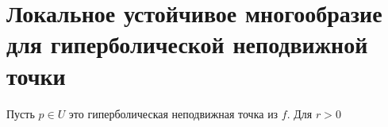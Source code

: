 \chapter{Локальное устойчивое многообразие для гиперболической неподвижной точки}

Пусть $p \in U$ это гиперболическая неподвижная точка из $f$. Для $r > 0$
